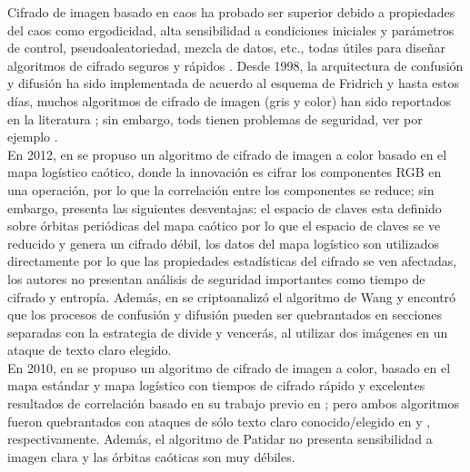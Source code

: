 Cifrado de imagen basado en caos ha probado ser superior debido a propiedades del caos como ergodicidad, alta sensibilidad a condiciones iniciales y parámetros de control, pseudoaleatoriedad, mezcla de datos, etc., todas útiles para diseñar algoritmos de cifrado seguros y rápidos \cite{HyX_2010, IyC_2013, WEtAl_2008, UEtAl_2010}. Desde 1998, la arquitectura de confusión y difusión ha sido implementada de acuerdo al esquema de Fridrich \cite{F_1998} y hasta estos días, muchos algoritmos de cifrado de imagen (gris y color) han sido reportados en la literatura \cite{PEtAl_2009, HyX_2010, WEtAl_2012, IyC_2013, F_1998, CEtAl_2004, WEtAl_2008, UEtAl_2010, WEtAl_2010, TyC_2008, FEtAl_2006, GEtAl_2006, XEtAl_2006, GEtAl_2005}; sin embargo, tods tienen problemas de seguridad, ver por ejemplo \cite{WEtAl_2005, WEtAl_2007, ByN_2008, CyS_2009, AyL_2009, LEtAl_2009, REtAl_2010, SEtAl_2010, LEtAl_2011, LEtAl_2012, ZEtAl_2012}. \\

En 2012, en \cite{WEtAl_2012} se propuso un algoritmo de cifrado de imagen a color basado en el mapa logístico caótico, donde la innovación es cifrar los componentes RGB en una operación, por lo que la correlación entre los componentes se reduce; sin embargo, presenta las siguientes desventajas: el espacio de claves esta definido sobre órbitas periódicas del mapa caótico por lo que el espacio de claves se ve reducido y genera un cifrado débil, los datos del mapa logístico son utilizados directamente por lo que las propiedades estadísticas del cifrado se ven afectadas, los autores no presentan análisis de seguridad importantes como tiempo de cifrado y entropía. Además, en \cite{LEtAl_2012} se criptoanalizó el algoritmo de Wang y encontró que los procesos de confusión y difusión pueden ser quebrantados en secciones separadas con la estrategia de divide y vencerás, al utilizar dos imágenes en un ataque de texto claro elegido. \\

En 2010, en \cite{PEtAl_2010} se propuso un algoritmo de cifrado de imagen a color, basado en el mapa estándar y mapa logístico con tiempos de cifrado rápido y excelentes resultados de correlación basado en su trabajo previo en \cite{PEtAl_2009}; pero ambos algoritmos fueron quebrantados con ataques de sólo texto claro conocido/elegido en \cite{REtAl_2010} y  \cite{LEtAl_2011}, respectivamente. Además, el algoritmo de Patidar no presenta sensibilidad a imagen clara y las órbitas caóticas son muy débiles. \\

